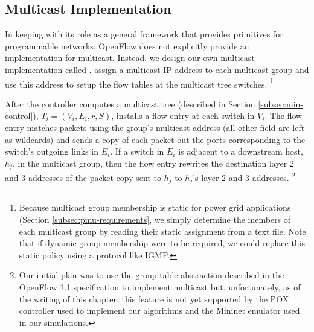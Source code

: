 \subsection{Multicast Implementation} 
\label{subsec:basic}

In keeping with its role as a general framework that provides primitives for programmable networks, OpenFlow does not explicitly provide an implementation for multicast. 
Instead, we design our own multicast implementation called \bases.  \base assign a multicast IP address to each multicast group and use
this address to setup the flow tables at the multicast tree switches.  
  \footnote{Because multicast group membership is static for power grid applications (Section \ref{subsec:pmu-requirements}, 
  we simply determine the members of each multicast group by reading their static assignment from a text file.  Note that if dynamic group membership were to be required, we could 
  replace this static policy using a protocol like IGMP. }

After the controller computes a multicast tree (described in Section \ref{subsec:min-control}), $T_i = (V_i,E_i,r,S)$, \base installs a flow entry at each switch in $V_i$. The flow entry
matches packets using the group's multicast address (all other field are left as wildcards) and sends a copy of each packet out the ports corresponding to the switch's 
outgoing links in $E_i$. If a switch in $E_i$ is adjacent to a downstream host, $h_j$, in the multicast group, then the flow entry rewrites the destination layer 2 and 3 addresses of the 
packet copy sent to $h_j$ to $h_j$'s layer 2 and 3 addresses.
\footnote{Our initial plan was to use the group table abstraction described in the OpenFlow 1.1 specification \cite{OpenFlowSpec1.1} to implement multicast but, unfortunately,
as of the writing of this chapter, this feature is not yet supported by the POX controller \cite{Pox} used to implement our algorithms and 
the Mininet emulator \cite{Lantz10} used in our simulations.}







